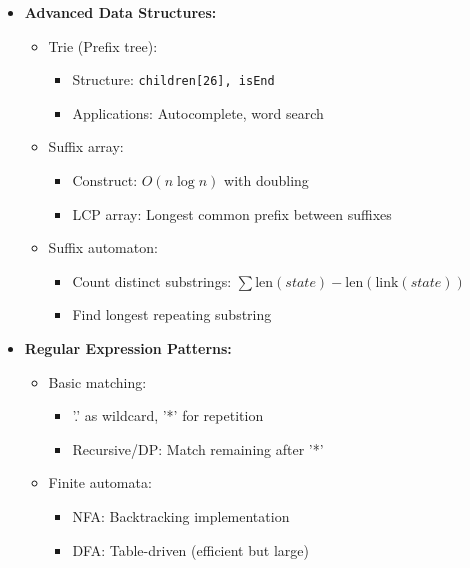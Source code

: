 \documentclass[a4paper,10pt]{book}
\begin{document}
\begin{itemize}
    \item \textbf{Advanced Data Structures:}
    \begin{itemize}
        \item Trie (Prefix tree):
        \begin{itemize}
            \item Structure: \texttt{children[26], isEnd}
            \item Applications: Autocomplete, word search
        \end{itemize}
        \item Suffix array:
        \begin{itemize}
            \item Construct: $O(n \log n)$ with doubling
            \item LCP array: Longest common prefix between suffixes
        \end{itemize}
        \item Suffix automaton:
        \begin{itemize}
            \item Count distinct substrings: $\sum \text{len}(state) - \text{len}(\text{link}(state))$
            \item Find longest repeating substring
        \end{itemize}
    \end{itemize}
    
    \item \textbf{Regular Expression Patterns:}
    \begin{itemize}
        \item Basic matching:
        \begin{itemize}
            \item '.' as wildcard, '*' for repetition
            \item Recursive/DP: Match remaining after '*'
        \end{itemize}
        \item Finite automata:
        \begin{itemize}
            \item NFA: Backtracking implementation
            \item DFA: Table-driven (efficient but large)
        \end{itemize}
    \end{itemize}
    

\end{itemize}
\end{document}
